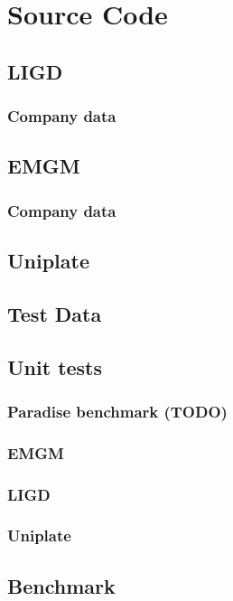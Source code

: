 \chapter{Source Code}

\lstset{frame=none}
\section{LIGD}

\subsection{Company data}

\section{EMGM}

\subsection{Company data}

\section{Uniplate}

\section{Test Data}

\section{Unit tests}
\subsection{Paradise benchmark (TODO)}

\subsection{EMGM}

\subsection{LIGD}

\subsection{Uniplate}


\section{Benchmark}

